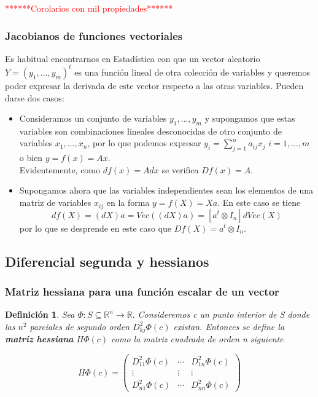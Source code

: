 \documentclass{article}
\theoremstyle{theorem-style}  %
\theoremstyle{definition-style}
\newtheorem{definition}{Definición}[section]
\theoremstyle{example-style}
\theoremstyle{exercise-style}
\begin{document}
	\textcolor{red}{******Corolarios con mil propiedades******}
	
	\subsubsection{Jacobianos de funciones vectoriales}
	
	Es habitual encontrarnos en Estadística con que un vector aleatorio $Y=(y_1,...,y_m)^t$ es una función lineal de otra colección de variables y queremos poder expresar la derivada de este vector respecto a las otras variables. Pueden darse dos casos:
	
	\begin{itemize}
		\item Consideramos un conjunto de variables $y_1,...,y_m$ y supongamos que estas variables son combinaciones lineales desconocidas de otro conjunto de variables $x_1,...,x_n$, por lo que podemos expresar $y_i = \sum_{j=1}^n a_{ij}x_j$ $i=1,...,m$ o bien $y=f(x)=Ax$.
		\\Evidentemente, como $df(x) = Adx$ se verifica $Df(x)=A$.
		
		\item Supongamos ahora que las variables independientes sean los elementos de una matriz de variables $x_{ij}$ en la forma $y=f(X)=Xa$. En este caso se tiene
		$$df(X)=(dX)a = Vec((dX)a) = [a^t \otimes I_n]dVec(X)$$
		por lo que se desprende en este caso que $Df(X) = a^t\otimes I_n.$
	\end{itemize}
	
	\subsection{Diferencial segunda y hessianos}
	
	\subsubsection{Matriz hessiana para una función escalar de un vector}
	
	\begin{definition}
		Sea $\Phi: S \subseteq \mathbb{R}^n \rightarrow \mathbb{R}.$ Consideremos c un punto interior de S donde las $n^2$ parciales de segundo orden $D^2_{kj}\Phi(c)$ existan. Entonces se define la \textbf{matriz hessiana} $H\Phi(c)$ como la matriz cuadrada de orden n siguiente
		
		$$H\Phi(c) = \left( \begin{matrix}
		D^2_{11}\Phi(c) & \cdots & D^2_{1n}\Phi(c)\\
		\vdots & \vdots & \vdots \\
		D^2_{n1}\Phi(c) & \cdots & D^2_{nn}\Phi(c) \end{matrix} \right)$$
	\end{definition}
	
\end{document}
